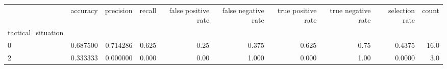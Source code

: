 \begin{tabular}{lrrrrrrrrr}
\toprule
{} &  accuracy &  precision &  recall &  false positive rate &  false negative rate &  true positive rate &  true negative rate &  selection rate &  count \\
tactical\_situation &           &            &         &                      &                      &                     &                     &                 &        \\
\midrule
0                  &  0.687500 &   0.714286 &   0.625 &                 0.25 &                0.375 &               0.625 &                0.75 &          0.4375 &   16.0 \\
2                  &  0.333333 &   0.000000 &   0.000 &                 0.00 &                1.000 &               0.000 &                1.00 &          0.0000 &    3.0 \\
\bottomrule
\end{tabular}
